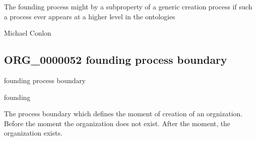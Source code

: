 \documentclass[letterpaper,10pt,english]{sphinxmanual}
\begin{document}
\begin{sphinxShadowBox}

\sphinxAtStartPar
The founding process might by a subproperty of a generic creation process if such a process ever appears at a higher level in the ontologies
\end{sphinxShadowBox}

\begin{sphinxShadowBox}

\sphinxAtStartPar
Michael Conlon 
\end{sphinxShadowBox}
\begin{quote}

\ignorespaces \end{quote}


\subsection{ORG\_0000052 \sphinxhyphen{} founding process boundary}
\label{\detokenize{doc-ORG_0000052:org-0000052-founding-process-boundary}}\label{\detokenize{doc-ORG_0000052:index-0}}\label{\detokenize{doc-ORG_0000052::doc}}
\begin{sphinxShadowBox}

\sphinxAtStartPar
founding process boundary
\end{sphinxShadowBox}

\begin{sphinxShadowBox}

\sphinxAtStartPar
founding
\end{sphinxShadowBox}

\begin{sphinxShadowBox}

\sphinxAtStartPar
{\hyperref[\detokenize{doc-BFO_0000035::doc}]{}}
\end{sphinxShadowBox}

\begin{sphinxShadowBox}

\sphinxAtStartPar
The process boundary which defines the moment of creation of an orgnization.  Before the moment  the organization does not exist.  After the moment, the organization exists.
\end{sphinxShadowBox}
\end{document}
